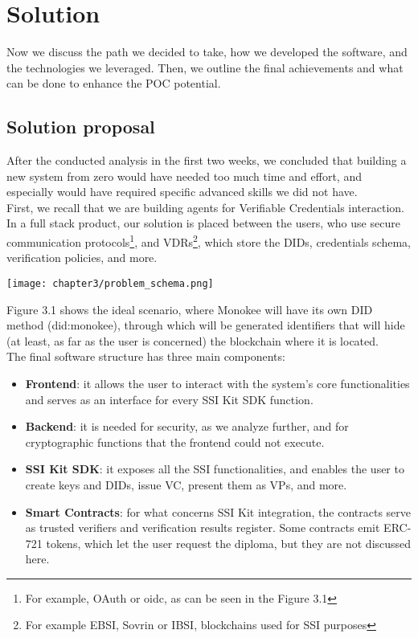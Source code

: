 
\chapter{Solution}
Now we discuss the path we decided to take, how we developed the software, 
and the technologies we leveraged. Then, we outline the final achievements 
and what can be done to enhance the POC potential.
\section{Solution proposal}
After the conducted analysis in the first two weeks, we concluded that building a 
new system from zero would have needed too much time and effort, and especially would 
have required specific advanced skills we did not have.\\
First, we recall that we are building agents for Verifiable Credentials interaction. 
In a full stack product, our solution is placed between the users, who use secure 
communication protocols\footnote{For example, OAuth or \acrshort{oidc}, as can be seen in the
Figure 3.1},  and VDRs\footnote{For example EBSI, Sovrin or IBSI, blockchains used for
SSI purposes}, which store the DIDs, credentials schema, verification policies, 
and more.
\begin{center}
    \texttt{[image: chapter3/problem\_schema.png]}
\end{center}
\vspace*{0.5cm}
Figure 3.1 shows the ideal scenario, where Monokee will have its own DID method
(did:monokee), through which will be generated identifiers that will hide (at least,
as far as the user is concerned) the blockchain where it is located.
\vspace*{0.3cm}\\
The final software structure has three main components:
\begin{itemize}
    \item \textbf{Frontend}: it allows the user to interact with the system's core 
    functionalities and serves as an interface for every SSI Kit SDK function.
    \item \textbf{Backend}: it is needed for security, as we analyze 
    further, and for cryptographic functions that the frontend could not execute.
    \item \textbf{SSI Kit SDK}: it exposes all the SSI functionalities, and enables 
    the user to create keys and DIDs, issue VC, present them as VPs, and more.
    \item \textbf{Smart Contracts}: for what concerns SSI Kit integration, the 
    contracts serve as trusted verifiers and verification results register. Some 
    contracts emit ERC-721 tokens, which let the user request the diploma, but they 
    are not discussed here.
\end{itemize}
